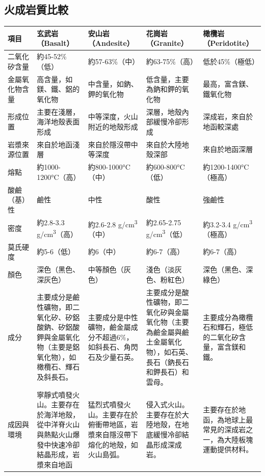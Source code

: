 \documentclass[a4paper,12pt]{report}
\begin{document}
\subsection{火成岩質比較}
\begin{longtable}[c]{|p{}|p{}|p{}|p{}|p{}|}
\hline
項目 & 玄武岩（Basalt） & 安山岩（Andesite） & 花崗岩（Granite） & 橄欖岩（Peridotite）\\
\hline
二氧化矽含量 & 約45-52\%（低） & 約57-63\%（中） & 約63-75\%（高） & 低於45\%（極低） \\
\hline
金屬氧化物含量 & 高含量，如鎂、鐵、鋁的氧化物 & 中含量，如鈉、鉀的氧化物 & 低含量，主要為鈉和鉀的氧化物 & 最高，富含鎂、鐵氧化物 \\
\hline
形成位置 & 主要在淺層，海洋地殼表面形成 & 中等深度，火山附近的地殼形成 & 深層，地殼內部緩慢冷卻形成 & 深成岩，來自於地函較深處 \\
\hline
岩漿來源位置 & 來自於地函淺層 & 來自於隱沒帶中等深度 & 來自於大陸地殼深部 & 來自於地函深層 \\
\hline
熔點 & 約1000-1200°C（高） & 約800-1000°C（中） & 約600-800°C（低） & 約1200-1400°C（極高） \\
\hline
酸鹼（基）性 & 鹼性 & 中性 & 酸性 & 強鹼性 \\
\hline
密度 & 約2.8-3.3 g/cm\textsuperscript{3}（高） & 約2.6-2.8 g/cm\textsuperscript{3}（中） & 約2.65-2.75 g/cm\textsuperscript{3}（低） & 約3.2-3.4 g/cm\textsuperscript{3}（極高） \\
\hline
莫氏硬度 & 約5-6（低） & 約6（中） & 約6-7（高） & 約6-7（高） \\
\hline
顏色 & 深色（黑色、深灰色） & 中等顏色（灰色） & 淺色（淡灰色、粉紅色） & 深色（黑色、深綠色） \\
\hline
成分 & 主要成分是鹼性礦物，即二氧化矽、矽鋁酸鈉、矽鋁酸鉀與金屬氧化物（主要是鋁氧化物），如橄欖石、輝石及斜長石。 & 主要成分是中性礦物，鹼金屬成分不超過6\%，如斜長石、角閃石及少量石英。 & 主要成分是酸性礦物，即二氧化矽與金屬氧化物（主要為鹼金屬與鹼土金屬氧化物），如石英、長石（鈉長石和鉀長石）和雲母。 & 主要成分為橄欖石和輝石，極低的二氧化矽含量，富含鎂和鐵。 \\
\hline
成因與環境 & 寧靜式噴發火山。主要存在於海洋地殼，從中洋脊火山與熱點火山爆發中快速冷卻結晶形成，岩漿來自地函 & 猛烈式噴發火山。主要存在於俯衝帶地區，岩漿來自隱沒帶下熔化的地殼，如火山島弧。 & 侵入式火山。主要存在於大陸地殼，在地底緩慢冷卻結晶形成深成岩。 & 主要存在於地函，為地球上最常見的深成岩之一，為大陸板塊運動提供材料。 \\
\hline
\end{longtable}
\end{document}

